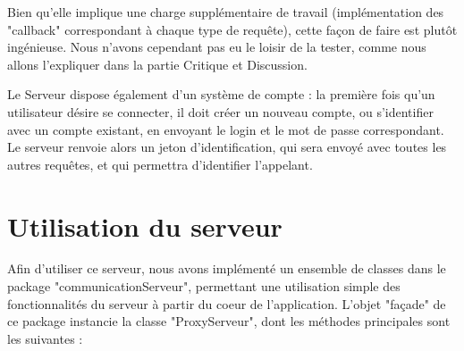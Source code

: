 \documentclass[a4paper, french, 11pt]{report}
\begin{document}
Bien qu'elle implique une charge supplémentaire de travail (implémentation des "callback" correspondant à chaque type de requête), cette façon de faire est plutôt ingénieuse. Nous n'avons cependant pas eu le loisir de la tester, comme nous allons l'expliquer dans la partie Critique et Discussion.

Le Serveur dispose également d'un système de compte : la première fois qu'un utilisateur désire se connecter, il doit créer un nouveau compte, ou s'identifier avec un compte existant, en envoyant le login et le mot de passe correspondant. Le serveur renvoie alors un jeton d'identification, qui sera envoyé avec toutes les autres requêtes, et qui permettra d'identifier l'appelant.
	
\section{Utilisation du serveur}

Afin d'utiliser ce serveur, nous avons implémenté un ensemble de classes dans le package "communicationServeur", permettant une utilisation simple des fonctionnalités du serveur à partir du coeur de l'application. L'objet "façade" de ce package instancie la classe "ProxyServeur", dont les méthodes principales sont les suivantes : 
	
\end{document}
